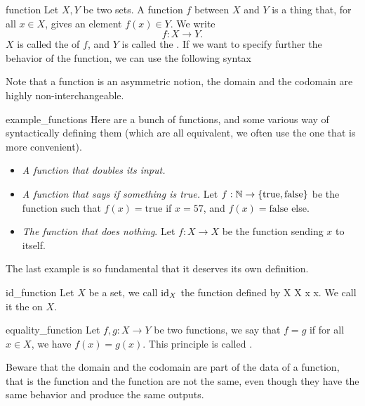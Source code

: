 \begin{cdef}{}{function}
    Let \( X, Y \) be two sets. A function \( f \) between \( X \) and \( Y \) is a thing that, for all \( x \in X \), gives an element \( f(x) \in Y \). We write
    \begin{equation*}
        f : X \to Y.
    \end{equation*}
    \( X \) is called the  of \( f \), and \( Y \) is called the . If we want to specify further the behavior of the function, we can use the following syntax
\end{cdef}

Note that a function is an asymmetric notion, the domain and the codomain are highly non-interchangeable. 
\begin{cexp}{}{example_functions}
    Here are a bunch of functions, and some various way of syntactically defining them (which are all equivalent, we often use the one that is more convenient).
    \begin{itemize}
        \item \textit{A function that doubles its input.}
        \item \textit{A function that says if something is true.} Let \( f : \mathbb{N} \to \{ \mathrm{true}, \mathrm{false} \} \) be the function such that \( f(x) = \mathrm{true} \) if \( x = 57 \), and \( f(x) = \mathrm{false} \) else. 
        \item \textit{The function that does nothing}. Let \( f : X \to X \) be the function sending \( x \) to itself.
    \end{itemize} 
\end{cexp}

The last example is so fundamental that it deserves its own definition.
\begin{cdef}{}{id_function}
    Let \( X \) be a set, we call \( \mathrm{id}_X \) the function defined by
     X X x x.
    We call it the  on \( X \).
\end{cdef}

\begin{cdef}{}{equality_function}
    Let \( f, g : X \to Y \) be two functions, we say that \( f = g \) if for all \( x \in X \), we have \( f(x) = g(x) \). This principle is called .
\end{cdef}
Beware that the domain and the codomain are part of the data of a function, that is the function
and the function
are not the same, even though they have the same behavior and produce the same outputs.

